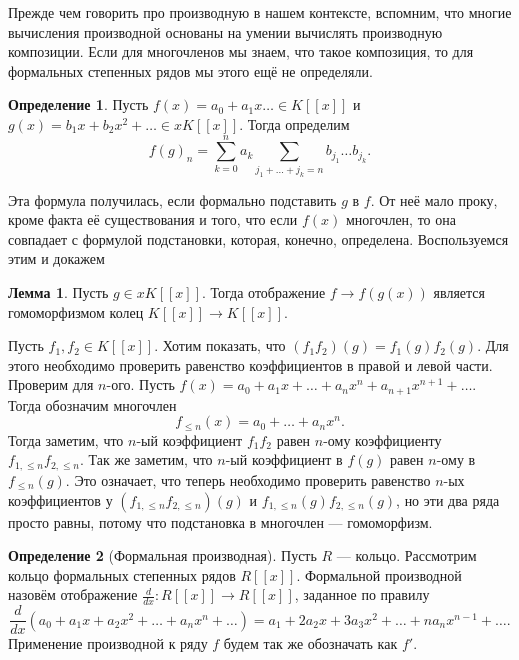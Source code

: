 \documentclass[10pt,a4paper,oneside]{book} %
\theoremstyle{definition}
\newtheorem*{defn}{Определение}
\newtheorem{lem}{Лемма}
\def\dfn{\begin{defn}}
\def\edfn{\end{defn}}
\def\lm{\begin{lem}}
\def\elm{\end{lem}}
\begin{document}
Прежде чем говорить про производную в нашем контексте, вспомним, что многие вычисления производной основаны на умении вычислять производную композиции. Если для многочленов мы знаем, что такое композиция, то для формальных степенных рядов мы этого ещё не определяли.

\dfn Пусть $f(x)=a_0+ a_1x\dots\in K[[x]]$ и $g(x)= b_1x+b_2x^2+\dots \in xK[[x]]$. Тогда определим
$$f(g)_n= \sum_{k=0}^n a_k\sum_{j_1+\dots+j_k=n} b_{j_1}\dots b_{j_k}.$$
\edfn

Эта формула получилась, если формально подставить $g$ в $f$. От неё мало проку, кроме факта её существования и того, что если $f(x)$ многочлен, то она совпадает с формулой подстановки, которая, конечно, определена. Воспользуемся этим и докажем

\lm Пусть $g\in xK[[x]]$. Тогда отображение $f \to f(g(x))$ является гомоморфизмом колец $K[[x]]\to K[[x]]$.
\elm
\proof Пусть $f_1, f_2 \in K[[x]]$. Хотим показать, что $(f_1f_2)(g)=f_1(g)f_2(g)$. Для этого необходимо проверить равенство коэффициентов в правой и левой части. Проверим для $n$-ого. Пусть $f(x)= a_0+a_1x+\dots+a_nx^n+a_{n+1}x^{n+1}+\dots$. Тогда обозначим многочлен
$$f_{\leq n}(x)=a_0+\dots+a_nx^n.$$
Тогда заметим, что $n$-ый коэффициент $f_1f_2$ равен $n$-ому коэффициенту $f_{1,\leq n}f_{2,\leq n}$. Так же заметим, что $n$-ый коэффициент в $f(g)$ равен $n$-ому в $f_{\leq n}(g)$. Это означает, что теперь необходимо проверить равенство $n$-ых коэффициентов у $(f_{1,\leq n}f_{2,\leq n})(g)$ и $f_{1,\leq n}(g)f_{2,\leq n}(g)$, но эти два ряда просто равны, потому что подстановка в многочлен --- гомоморфизм. \endproof

\dfn[Формальная производная] Пусть $R$ --- кольцо. Рассмотрим кольцо формальных степенных рядов $R[[x]]$. Формальной производной назовём отображение
$\frac{d}{dx}\colon R[[x]]\to R[[x]]$, заданное по правилу
$$\frac{d}{dx}(a_0+a_1x+a_2x^2+\dots+a_nx^n+\dots) = a_1+2a_2x+3a_3x^2+\dots+na_nx^{n-1}+\dots.$$
Применение производной к ряду $f$ будем так же обозначать как $f'$.
\edfn
\end{document}
